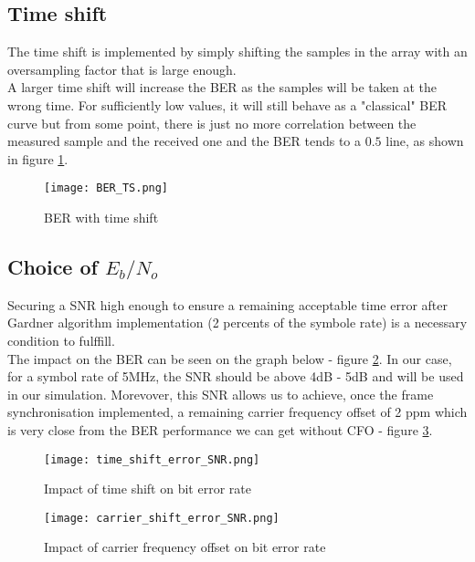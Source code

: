 \subsection{Time shift}
The time shift is implemented by simply shifting the samples in the array with an oversampling factor that is large enough. \\
A larger time shift will increase the BER as the samples will be taken at the wrong time. For sufficiently low values, it will still behave as a "classical" BER curve but from some point, there is just no more correlation between the measured sample and the received one and the BER tends to a $0.5$ line, as shown in figure \ref{fig:BER_TS}. \\

\begin{figure}[H]
    \centering
    \texttt{[image: BER\_TS.png]}
    \caption{BER with time shift}
    \label{fig:BER_TS}
\end{figure}

\subsection{Choice of $E_{b}/N_{o}$}
Securing a SNR high enough to ensure a remaining acceptable time error after Gardner algorithm implementation
 (2 percents of the symbole rate) is a necessary condition to fulffill.\\
The impact on the BER can be seen on the graph below - figure \ref{fig:time_shift_error_SNR}.
In our case, for a symbol rate of 5MHz, the SNR should be above 4dB - 5dB and will be used in our simulation.
Morevover, this SNR allows us to achieve, once the frame synchronisation implemented, a remaining carrier frequency offset
of 2 ppm which is very close from the BER performance we can get without CFO - figure \ref{fig:carrier_shift_error_SNR}.


\begin{figure}[H]
    \centering
    \texttt{[image: time\_shift\_error\_SNR.png]}
    \caption{Impact of time shift on bit error rate}
    \label{fig:time_shift_error_SNR}
\end{figure}

\begin{figure}[H]
    \centering
    \texttt{[image: carrier\_shift\_error\_SNR.png]}
    \caption{Impact of carrier frequency offset on bit error rate}
    \label{fig:carrier_shift_error_SNR}
\end{figure}

